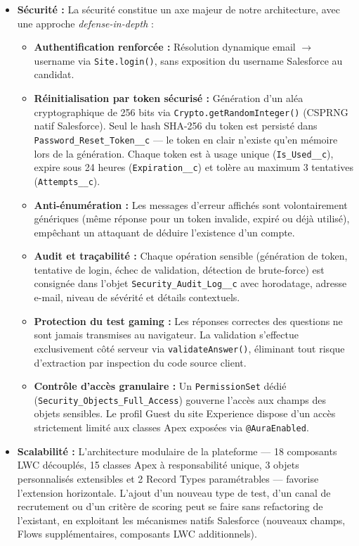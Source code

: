 \begin{itemize}
    \item \textbf{Sécurité :} La sécurité constitue un axe majeur de notre architecture, avec une approche \textit{defense-in-depth} :
    \begin{itemize}
        \item \textbf{Authentification renforcée :} Résolution dynamique email $\rightarrow$ username via \texttt{Site.login()}, sans exposition du username Salesforce au candidat.
        \item \textbf{Réinitialisation par token sécurisé :} Génération d'un aléa cryptographique de 256 bits via \texttt{Crypto.getRandomInteger()} (CSPRNG natif Salesforce). Seul le hash SHA-256 du token est persisté dans \texttt{Password\_Reset\_Token\_\_c} — le token en clair n'existe qu'en mémoire lors de la génération. Chaque token est à usage unique (\texttt{Is\_Used\_\_c}), expire sous 24 heures (\texttt{Expiration\_\_c}) et tolère au maximum 3 tentatives (\texttt{Attempts\_\_c}).
        \item \textbf{Anti-énumération :} Les messages d'erreur affichés sont volontairement génériques (même réponse pour un token invalide, expiré ou déjà utilisé), empêchant un attaquant de déduire l'existence d'un compte.
        \item \textbf{Audit et traçabilité :} Chaque opération sensible (génération de token, tentative de login, échec de validation, détection de brute-force) est consignée dans l'objet \texttt{Security\_Audit\_Log\_\_c} avec horodatage, adresse e-mail, niveau de sévérité et détails contextuels.
        \item \textbf{Protection du test gaming :} Les réponses correctes des questions ne sont jamais transmises au navigateur. La validation s'effectue exclusivement côté serveur via \texttt{validateAnswer()}, éliminant tout risque d'extraction par inspection du code source client.
        \item \textbf{Contrôle d'accès granulaire :} Un \texttt{PermissionSet} dédié (\texttt{Security\_Objects\_Full\_Access}) gouverne l'accès aux champs des objets sensibles. Le profil Guest du site Experience dispose d'un accès strictement limité aux classes Apex exposées via \texttt{@AuraEnabled}.
    \end{itemize}

    \item \textbf{Scalabilité :} L'architecture modulaire de la plateforme — 18 composants LWC découplés, 15 classes Apex à responsabilité unique, 3 objets personnalisés extensibles et 2 Record Types paramétrables — favorise l'extension horizontale. L'ajout d'un nouveau type de test, d'un canal de recrutement ou d'un critère de scoring peut se faire sans refactoring de l'existant, en exploitant les mécanismes natifs Salesforce (nouveaux champs, Flows supplémentaires, composants LWC additionnels).


\end{itemize}
